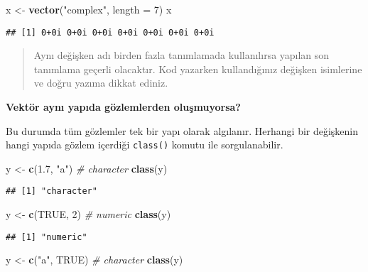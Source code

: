 \documentclass[
]{book}
\newenvironment{Shaded}{\begin{snugshade}}{\end{snugshade}}
\newcommand{\CommentTok}[1]{\textcolor[rgb]{0.56,0.35,0.01}{\textit{#1}}}
\newcommand{\DataTypeTok}[1]{\textcolor[rgb]{0.13,0.29,0.53}{#1}}
\newcommand{\DecValTok}[1]{\textcolor[rgb]{0.00,0.00,0.81}{#1}}
\newcommand{\FloatTok}[1]{\textcolor[rgb]{0.00,0.00,0.81}{#1}}
\newcommand{\KeywordTok}[1]{\textcolor[rgb]{0.13,0.29,0.53}{\textbf{#1}}}
\newcommand{\NormalTok}[1]{#1}
\newcommand{\OtherTok}[1]{\textcolor[rgb]{0.56,0.35,0.01}{#1}}
\newcommand{\StringTok}[1]{\textcolor[rgb]{0.31,0.60,0.02}{#1}}
\begin{document}
\begin{Shaded}
\begin{Highlighting}[]
\NormalTok{x <-}\StringTok{ }\KeywordTok{vector}\NormalTok{(}\StringTok{"complex"}\NormalTok{, }\DataTypeTok{length =} \DecValTok{7}\NormalTok{)}
\NormalTok{x}
\end{Highlighting}
\end{Shaded}

\begin{verbatim}
## [1] 0+0i 0+0i 0+0i 0+0i 0+0i 0+0i 0+0i
\end{verbatim}

\begin{quote}
Aynı değişken adı birden fazla tanımlamada kullanılırsa yapılan son tanımlama geçerli olacaktır. Kod yazarken kullandığınız değişken isimlerine ve doğru yazıma dikkat ediniz.
\end{quote}

\textbf{Vektör aynı yapıda gözlemlerden oluşmuyorsa?}

Bu durumda tüm gözlemler tek bir yapı olarak algılanır. Herhangi bir değişkenin hangi yapıda gözlem içerdiği \texttt{class()} komutu ile sorgulanabilir.

\begin{Shaded}
\begin{Highlighting}[]
\NormalTok{y <-}\StringTok{ }\KeywordTok{c}\NormalTok{(}\FloatTok{1.7}\NormalTok{, }\StringTok{"a"}\NormalTok{)  }\CommentTok{# character }
\KeywordTok{class}\NormalTok{(y)}
\end{Highlighting}
\end{Shaded}

\begin{verbatim}
## [1] "character"
\end{verbatim}

\begin{Shaded}
\begin{Highlighting}[]
\NormalTok{y <-}\StringTok{ }\KeywordTok{c}\NormalTok{(}\OtherTok{TRUE}\NormalTok{, }\DecValTok{2}\NormalTok{) }\CommentTok{# numeric}
\KeywordTok{class}\NormalTok{(y)}
\end{Highlighting}
\end{Shaded}

\begin{verbatim}
## [1] "numeric"
\end{verbatim}

\begin{Shaded}
\begin{Highlighting}[]
\NormalTok{y <-}\StringTok{ }\KeywordTok{c}\NormalTok{(}\StringTok{"a"}\NormalTok{, }\OtherTok{TRUE}\NormalTok{) }\CommentTok{# character}
\KeywordTok{class}\NormalTok{(y)}
\end{Highlighting}
\end{Shaded}
\end{document}
